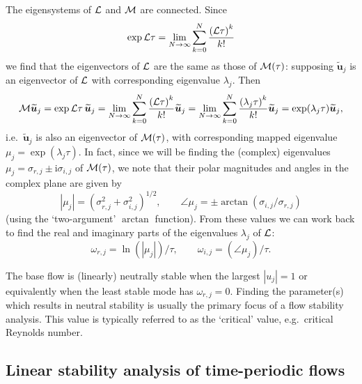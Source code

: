 \documentclass[11pt,a4paper]{report}
\newcommand\ci{\mathrm{i}}
\newcommand\wt[1]{\widetilde{#1}}
\newcommand{\ie}{i.e.\ }
\newcommand{\eg}{e.g.\ }
\newcommand\Lop{{\cal L}}
\newcommand\Mop{{\cal M}}
\begin{document}
The eigensystems of $\Lop$ and $\Mop$ are connected.  Since
\begin{equation}
\exp \Lop\tau =
\lim_{N\to\infty}
\sum_{k=0}^{N}
\frac{\left(\Lop\tau\right)^k}{k!}
\end{equation}
we find that the eigenvectors of $\Lop$ are the same as those of
$\Mop(\tau)$: supposing $\wt{\bm{u}}_j$ is an eigenvector of $\Lop$ with
corresponding eigenvalue $\lambda_j$.  Then
\begin{equation}
\Mop\wt{\bm{u}}_j=
\exp \Lop\tau\,\wt{\bm{u}}_j=
\lim_{N\to\infty}\sum_{k=0}^N\frac{\left(\Lop\tau\right)^k}{k!}\wt{\bm{u}}_j=
\lim_{N\to\infty}\sum_{k=0}^N\frac{\left(\lambda_j \tau\right)^k}{k!}\wt{\bm{u}}_j=
\exp(\lambda_j\tau)\wt{\bm{u}}_j,
\end{equation}
\ie $\wt{\bm{u}}_j$ is also an eigenvector of $\Mop(\tau)$, with
corresponding mapped eigenvalue $\mu_j=\exp(\lambda_j\tau)$.  In fact,
since we will be finding the (complex) eigenvalues
$\mu_j=\sigma_{r,j}\pm\ci\sigma_{i,j}$ of $\Mop(\tau)$, we note that
their polar magnitudes and angles in the complex plane are given by
\begin{equation}
|\mu_j|=(\sigma_{r,j}^2+\sigma_{i,j}^2)^{1/2},\qquad
\angle\mu_j=\pm\arctan(\sigma_{i,j}/\sigma_{r,j})
\end{equation}
(using the `two-argument' $\arctan$ function).  From these values we
can work back to find the real and imaginary parts of the eigenvalues
$\lambda_j$ of $\Lop$:
\begin{equation}
\omega_{r,j}=\ln(|\mu_j|)/\tau,\qquad
\omega_{i,j}=(\angle\mu_j)/\tau.
\end{equation}

The base flow is (linearly) neutrally stable when the largest
$|u_j|=1$ or equivalently when the least stable mode has
$\omega_{r,j}=0$.  Finding the parameter(s) which results in neutral
stability is usually the primary focus of a flow stability
analysis. This value is typically referred to as the `critical' value,
\eg critical Reynolds number.

\subsection{Linear stability analysis of time-periodic flows}
\end{document}
